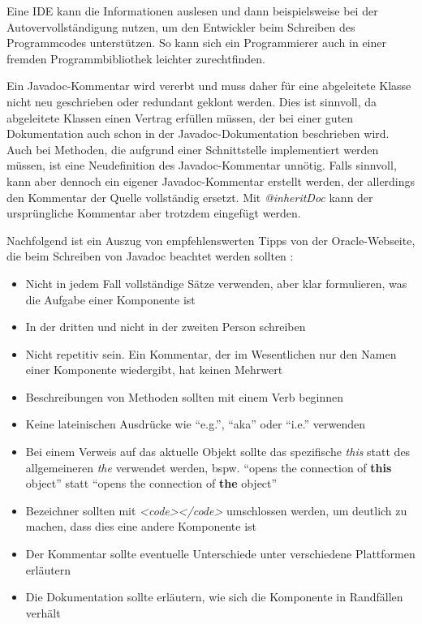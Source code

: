 Eine \ac{IDE} kann die Informationen auslesen und dann beispielsweise bei der Autovervollständigung nutzen, um den Entwickler beim Schreiben des Programmcodes unterstützen. So kann sich ein Programmierer auch in einer fremden Programmbibliothek leichter zurechtfinden.

Ein Javadoc-Kommentar wird vererbt und muss daher für eine abgeleitete Klasse nicht neu geschrieben oder redundant geklont werden. Dies ist sinnvoll, da abgeleitete Klassen einen Vertrag erfüllen müssen, der bei einer guten Dokumentation auch schon in der Javadoc-Dokumentation beschrieben wird. Auch bei Methoden, die aufgrund einer Schnittstelle implementiert werden müssen, ist eine Neudefinition des Javadoc-Kommentar unnötig. Falls sinnvoll, kann aber dennoch ein eigener Javadoc-Kommentar erstellt werden, der allerdings den Kommentar der Quelle vollständig ersetzt. Mit \textit{@inheritDoc} kann der ursprüngliche Kommentar aber trotzdem eingefügt werden.

Nachfolgend ist ein Auszug von empfehlenswerten Tipps von der Oracle-Webseite, die beim Schreiben von Javadoc beachtet werden sollten \cite{HowtoWriteDocCommentsfortheJavadocTool}:
\begin{itemize}
    \item Nicht in jedem Fall vollständige Sätze verwenden, aber klar formulieren, was die Aufgabe einer Komponente ist
    \item In der dritten und nicht in der zweiten Person schreiben
    \item Nicht repetitiv sein. Ein Kommentar, der im Wesentlichen nur den Namen einer Komponente wiedergibt, hat keinen Mehrwert
    \item  Beschreibungen von Methoden sollten mit einem Verb beginnen
    \item Keine lateinischen Ausdrücke wie \enquote{e.g.}, \enquote{aka} oder \enquote{i.e.} verwenden
    \item Bei einem Verweis auf das aktuelle Objekt sollte das spezifische \textit{this} statt des allgemeineren \textit{the} verwendet werden, bspw. \enquote{opens the connection of \textbf{this} object} statt \enquote{opens the connection of \textbf{the} object}
    \item Bezeichner sollten mit \textit{<code></code>} umschlossen werden, um deutlich zu machen, dass dies eine andere Komponente ist
    \item Der Kommentar sollte eventuelle Unterschiede unter verschiedene Plattformen erläutern
    \item Die Dokumentation sollte erläutern, wie sich die Komponente in Randfällen verhält
    
\end{itemize}

